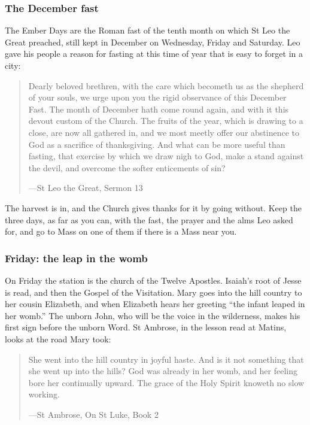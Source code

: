 \subsubsection*{The December fast}

The Ember Days are the Roman fast of the tenth month on which St Leo the Great
preached, still kept in December on Wednesday, Friday and Saturday. Leo gave
his people a reason for fasting at this time of year that is easy to forget in
a city:

\begin{quote}
Dearly beloved brethren, with the care which becometh us as the shepherd of
your souls, we urge upon you the rigid observance of this December Fast. The
month of December hath come round again, and with it this devout custom of the
Church. The fruits of the year, which is drawing to a close, are now all
gathered in, and we most meetly offer our abstinence to God as a sacrifice of
thanksgiving. And what can be more useful than fasting, that exercise by which
we draw nigh to God, make a stand against the devil, and overcome the softer
enticements of sin?\par
{\smallskip\noindent\small ---St Leo the Great, Sermon 13\par}
\end{quote}

The harvest is in, and the Church gives thanks for it by going without. Keep
the three days, as far as you can, with the fast, the prayer and the alms Leo
asked for, and go to Mass on one of them if there is a Mass near you.

\subsubsection*{Friday: the leap in the womb}

On Friday the station is the church of the Twelve Apostles. Isaiah's root of
Jesse is read, and then the Gospel of the Visitation. Mary goes into the hill
country to her cousin Elizabeth, and when Elizabeth hears her greeting ``the
infant leaped in her womb.'' The unborn John, who will be the voice in the
wilderness, makes his first sign before the unborn Word. St Ambrose, in the
lesson read at Matins, looks at the road Mary took:

\begin{quote}
She went into the hill country in joyful haste. And is it not something that
she went up into the hills? God was already in her womb, and her feeling bore
her continually upward. The grace of the Holy Spirit knoweth no slow
working.\par
{\smallskip\noindent\small ---St Ambrose, On St Luke, Book 2\par}
\end{quote}

